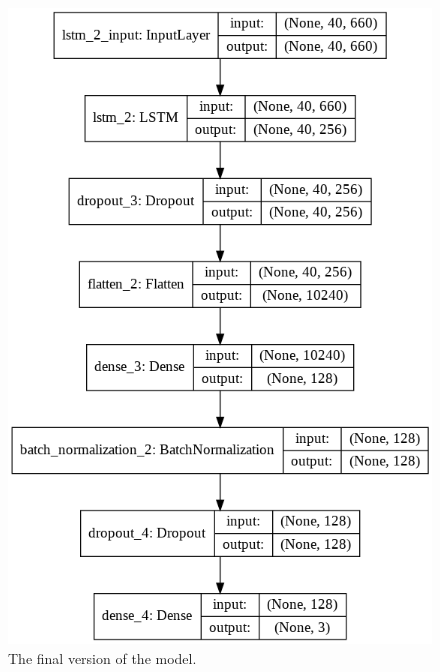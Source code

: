 \documentclass{article}
\begin{document}
	\begin{figure}
	\centering
	\includegraphics[width = \textwidth]{model}
	\caption{The final version of the model.}
	\label{fig:model}
	\end{figure}
\end{document}
